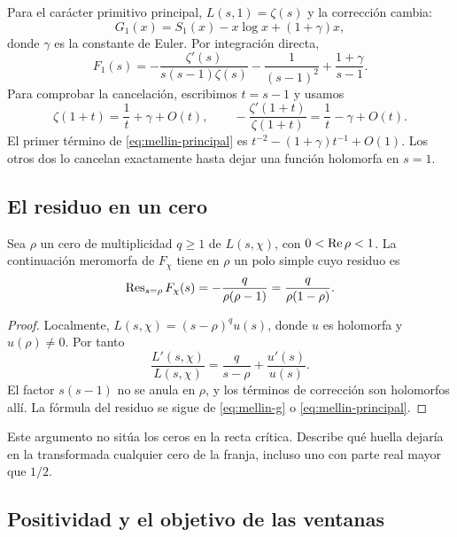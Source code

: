 Para el carácter primitivo principal, $L(s,1)=\zeta(s)$ y la corrección cambia:
\begin{equation}
 G_1(x)=S_1(x)-x\log x+(1+\gamma)x,
 \label{eq:g-principal}
\end{equation}
donde $\gamma$ es la constante de Euler. Por integración directa,
\begin{equation}
 F_1(s)=
 -\frac{\zeta'(s)}{s(s-1)\zeta(s)}
 -\frac1{(s-1)^2}+\frac{1+\gamma}{s-1}.
 \label{eq:mellin-principal}
\end{equation}
Para comprobar la cancelación, escribimos $t=s-1$ y usamos
\[
 \zeta(1+t)=\frac1t+\gamma+O(t),\qquad
 -\frac{\zeta'(1+t)}{\zeta(1+t)}=\frac1t-\gamma+O(t).
\]
El primer término de \eqref{eq:mellin-principal} es
$t^{-2}-(1+\gamma)t^{-1}+O(1)$. Los otros dos lo cancelan exactamente
hasta dejar una función holomorfa en $s=1$.

\subsection{El residuo en un cero}

\begin{proposicion}
Sea $\rho$ un cero de multiplicidad $q\ge1$ de $L(s,\chi)$, con
$0<\operatorname{Re}\rho<1$. La continuación meromorfa de $F_\chi$ tiene en $\rho$
un polo simple cuyo residuo es
\begin{equation}
 \operatorname{Res}_{s=\rho}F_\chi(s)
 =-\frac{q}{\rho(\rho-1)}
 =\frac{q}{\rho(1-\rho)}.
 \label{eq:residuo}
\end{equation}
\end{proposicion}

\begin{proof}
Localmente, $L(s,\chi)=(s-\rho)^q u(s)$, donde $u$ es holomorfa y
$u(\rho)\ne0$. Por tanto
\[
 \frac{L'(s,\chi)}{L(s,\chi)}
 =\frac{q}{s-\rho}+\frac{u'(s)}{u(s)}.
\]
El factor $s(s-1)$ no se anula en $\rho$, y los términos de corrección
son holomorfos allí. La fórmula del residuo se sigue de
\eqref{eq:mellin-g} o \eqref{eq:mellin-principal}.
\end{proof}

Este argumento no sitúa los ceros en la recta crítica. Describe qué huella
dejaría en la transformada cualquier cero de la franja, incluso uno con
parte real mayor que $1/2$.

\subsection{Positividad y el objetivo de las ventanas}

